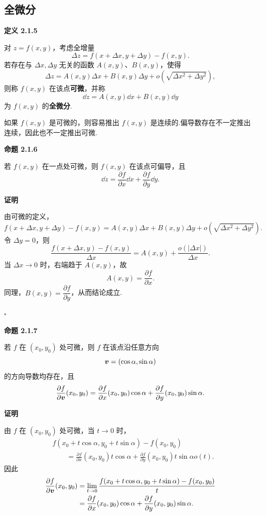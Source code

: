 \subsection*{全微分}



\textbf{定义 2.1.5}

对 $z=f(x,y)$，考虑全增量
\[
\Delta z=f(x+\Delta x,y+\Delta y)-f(x,y).
\]
若存在与 $\Delta x,\Delta y$ 无关的函数 $A(x,y)$、$B(x,y)$，使得
\[
\Delta z=A(x,y)\Delta x+B(x,y)\Delta y
+o\!\left(\sqrt{\Delta x^2+\Delta y^2}\right),
\]
则称 $f(x,y)$ 在该点\textbf{可微}，并称
\[
\dd z=A(x,y)\dd x+B(x,y)\dd y
\]
为 $f(x,y)$ 的\textbf{全微分}.




如果 $f(x,y)$ 是可微的，则容易推出 $f(x,y)$ 是连续的.偏导数存在不一定推出连续，因此也不一定推出可微.



\textbf{命题 2.1.6}

若 $f(x,y)$ 在一点处可微，则 $f(x,y)$ 在该点可偏导，且
\[
\dd z=\frac{\partial f}{\partial x}\dd x+\frac{\partial f}{\partial y}\dd y.
\]






\textbf{证明}

由可微的定义，
\[
f(x+\Delta x,y+\Delta y)-f(x,y)
=A(x,y)\Delta x+B(x,y)\Delta y
+o\!\left(\sqrt{\Delta x^2+\Delta y^2}\right).
\]
令 $\Delta y=0$，则
\[
\frac{f(x+\Delta x,y)-f(x,y)}{\Delta x}
=A(x,y)+\frac{o(|\Delta x|)}{\Delta x}.
\]
当 $\Delta x\to0$ 时，右端趋于 $A(x,y)$，故
\[
A(x,y)=\frac{\partial f}{\partial x}.
\]
同理，$B(x,y)=\dfrac{\partial f}{\partial y}$，从而结论成立.


$\square$





\textbf{命题 2.1.7}

若 $f$ 在 $(x_0,y_0)$ 处可微，则 $f$ 在该点沿任意方向
	\[
	\boldsymbol{v}=(\cos\alpha,\sin\alpha)
	\]
	的方向导数均存在，且
	\[
	\frac{\partial f}{\partial\boldsymbol{v}}(x_0,y_0)
	=
	\frac{\partial f}{\partial x}(x_0,y_0)\cos\alpha
	+
	\frac{\partial f}{\partial y}(x_0,y_0)\sin\alpha.
	\]






\textbf{证明}

由 $f$ 在 $(x_0,y_0)$ 处可微，当 $t\to0$ 时，
	\[
	\begin{aligned}
	&f(x_0+t\cos\alpha,y_0+t\sin\alpha)-f(x_0,y_0)\\
	&\qquad=
	\frac{\partial f}{\partial x}(x_0,y_0)t\cos\alpha
	+
	\frac{\partial f}{\partial y}(x_0,y_0)t\sin\alpha
o(t).
	\end{aligned}
	\]
	因此
	\[
	\begin{aligned}
	\frac{\partial f}{\partial\boldsymbol{v}}(x_0,y_0)
	&=
	\lim_{t\to0}
	\frac{f(x_0+t\cos\alpha,y_0+t\sin\alpha)-f(x_0,y_0)}{t}\\
	&=
	\frac{\partial f}{\partial x}(x_0,y_0)\cos\alpha
	+
	\frac{\partial f}{\partial y}(x_0,y_0)\sin\alpha.
	\end{aligned}
	\]


